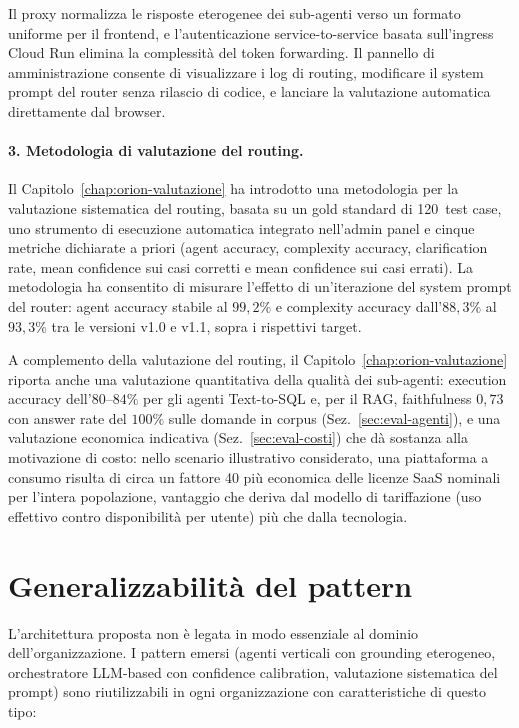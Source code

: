 Il proxy normalizza le risposte eterogenee dei sub-agenti verso un formato uniforme per il frontend, 
e l'autenticazione service-to-service basata sull'ingress Cloud Run elimina la complessità del token forwarding. 
Il pannello di amministrazione consente di visualizzare i log di routing, modificare il system prompt del router senza rilascio di codice, 
e lanciare la valutazione automatica direttamente dal browser.

\paragraph{3. Metodologia di valutazione del routing.} Il Capitolo~\ref{chap:orion-valutazione} ha introdotto una metodologia per la valutazione sistematica del routing, 
basata su un gold standard di 120~test case, uno strumento di esecuzione automatica integrato nell'admin panel e cinque metriche dichiarate a priori
(agent accuracy, complexity accuracy, clarification rate, mean confidence sui casi corretti e mean confidence sui casi errati). 
La metodologia ha consentito di misurare l'effetto di un'iterazione del system prompt del router: 
agent accuracy stabile al $99{,}2\%$ e complexity accuracy dall'$88{,}3\%$ al $93{,}3\%$ tra le versioni v1.0 e v1.1, sopra i rispettivi target.

A complemento della valutazione del routing, il Capitolo~\ref{chap:orion-valutazione} riporta anche una valutazione quantitativa della qualità dei sub-agenti: 
execution accuracy dell'$80$--$84\%$ per gli agenti Text-to-SQL e, per il RAG, faithfulness $0{,}73$ con answer rate del $100\%$ sulle domande in corpus (Sez.~\ref{sec:eval-agenti}), 
e una valutazione economica indicativa (Sez.~\ref{sec:eval-costi}) che dà sostanza alla motivazione di costo: nello scenario illustrativo considerato, 
una piattaforma a consumo risulta di circa un fattore 40 più economica delle licenze SaaS nominali per l'intera popolazione, 
vantaggio che deriva dal modello di tariffazione (uso effettivo contro disponibilità per utente) più che dalla tecnologia.

\section{Generalizzabilità del pattern}
\label{sec:concl-generalizzabilita}

L'architettura proposta non è legata in modo essenziale al dominio dell'organizzazione. I pattern emersi (agenti verticali con grounding eterogeneo, orchestratore LLM-based con confidence calibration, 
valutazione sistematica del prompt) sono riutilizzabili in ogni organizzazione con caratteristiche di questo tipo:

